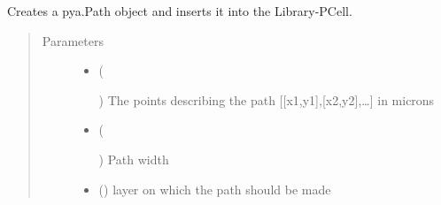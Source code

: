\documentclass[a4paper,10pt,english]{sphinxmanual}
\begin{document}
\begin{fulllineitems}
\begin{fulllineitems}
\begin{quote}
\begin{description}
\end{description}\end{quote}

\end{fulllineitems}


\begin{fulllineitems}
\label{\detokenize{photonics/photonics:kppc.photonics.PhotDevice.create_path}}
Creates a pya.Path object and inserts it into the Library-PCell.
\begin{quote}\begin{description}
\item[{Parameters}] \leavevmode\begin{itemize}
\item {} 
 (%
\begin{footnote}[48]\sphinxAtStartFootnote
{}
%
\end{footnote}) \textendash{} The points describing the path {[}{[}x1,y1{]},{[}x2,y2{]},…{]} in microns

\item {} 
 (%
\begin{footnote}[49]\sphinxAtStartFootnote
{}
%
\end{footnote}) \textendash{} Path width

\item {} 
 () \textendash{} layer on which the path should be made

\end{itemize}

\end{description}\end{quote}

\end{fulllineitems}


\end{fulllineitems}
\end{document}
